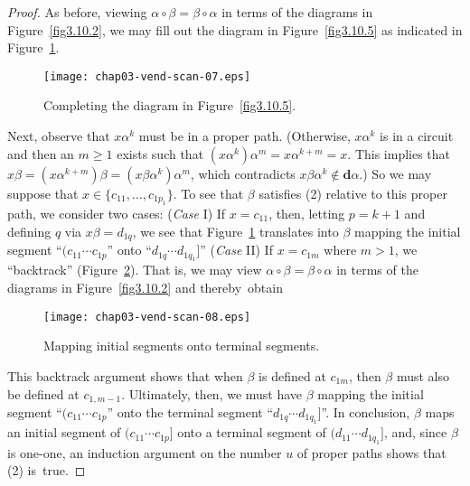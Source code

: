 \documentclass{surv-l}
\numberwithin{equation}{section}
\numberwithin{table}{section}
\numberwithin{figure}{section}
\theoremstyle{definition}
\begin{document}
\begin{proof}
As before, viewing $\alpha \circ\beta=\beta \circ\alpha$ in terms
of the diagrams in Figure~\ref{fig3.10.2}, we may fill out the
diagram in Figure~\ref{fig3.10.5} as indicated in
Figure~\ref{fig3.10.6}.

\begin{figure}[!h]
\texttt{[image: chap03-vend-scan-07.eps]}
\caption{Completing the diagram in Figure~\ref{fig3.10.5}.\label{fig3.10.6}}
\end{figure}

Next, observe that $x\alpha^{k}$ must be in a proper path.
(Otherwise, $x\alpha^{k}$ is in a circuit and then an $m\geq 1$
exists such that $(x\alpha^{k})\alpha^{m}=x\alpha^{k+m}=x$. This
implies that
$x\beta=(x\alpha^{k+m})\beta=(x\beta\alpha^{k})\alpha^{m}$, which
contradicts $x\beta\alpha^{k}\not\in \mathbf{d}\alpha.$) So we may
suppose that $x\in\{c_{11},\ldots, c_{1p_{1}}\}$. To see that
$\beta$ satisfies (2) relative to this proper path, we consider
two cases: (\emph{Case} I) If $x=c_{11}$, then, letting $p=k+1$
and defining $q$ via $x\beta=d_{1q}$, we see that
Figure~\ref{fig3.10.6} translates into $\beta$ mapping the initial
segment ``$(c_{11}\cdots c_{1p}$'' onto ``$d_{1q}\cdots d_{1q_{1}}$]''
(\emph{Case} II) If $x=c_{1m}$ where $m>1$, we ``backtrack''
(Figure~\ref{fig3.10.7}). That is, we may view $\alpha
\circ\beta=\beta \circ\alpha$ in terms of the diagrams in
Figure~\ref{fig3.10.2} and thereby~obtain

\begin{figure}[!h]
\texttt{[image: chap03-vend-scan-08.eps]}
\caption{Mapping initial segments onto terminal segments.\label{fig3.10.7}}
\end{figure}

This backtrack argument shows that when $\beta$ is defined at
$c_{1m}$, then $\beta$ must also be defined at $c_{1,m-1}$.
Ultimately, then, we must have $\beta$ mapping the initial segment
``$(c_{11}\cdots c_{1p}$'' onto the terminal segment ``$d_{1q}\cdots
d_{1q_{1}}$]''. In conclusion, $\beta$ maps an initial segment of
$(c_{11}\cdots c_{1p}]$ onto a terminal segment of $(d_{11}\cdots
d_{1q_{1}}]$, and, since $\beta$ is one-one, an induction argument
on the number $u$ of proper paths shows that (2) is~true.


\end{proof}
\end{document}
